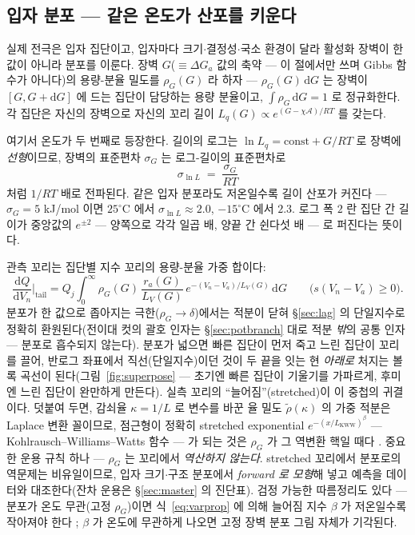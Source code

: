 \documentclass[11pt,a4paper]{article}
\newcommand{\dd}{\mathrm{d}}
\begin{document}
\subsection{입자 분포 — 같은 온도가 산포를 키운다}
실제 전극은 입자 집단이고, 입자마다 크기$\cdot$결정성$\cdot$국소 환경이 달라 활성화 장벽이 한 값이 아니라
분포를 이룬다. 장벽 $G$($\equiv\Delta G_{a}$ 값의 축약 — 이 절에서만 쓰며 Gibbs 함수가 아니다)의
용량-분율 밀도를 $\rho_G(G)$ 라 하자 — $\rho_G(G)\,\dd G$ 는 장벽이
$[G,G+\dd G]$ 에 드는 집단이 담당하는 용량 분율이고, $\int\rho_G\,\dd G=1$ 로 정규화한다. 각 집단은
자신의 장벽으로 자신의 꼬리 길이 $L_q(G)\propto e^{(G-\chi\mathcal A)/RT}$ 를 갖는다.

여기서 온도가 두 번째로 등장한다. 길이의 로그는 $\ln L_q=\text{const}+G/RT$ 로 장벽에 \emph{선형}이므로,
장벽의 표준편차 $\sigma_G$ 는 로그-길이의 표준편차로
\begin{equation}
\sigma_{\ln L}\;=\;\frac{\sigma_G}{RT}
\label{eq:varprop}
\end{equation}
처럼 $1/RT$ 배로 전파된다. 같은 입자 분포라도 저온일수록 길이 산포가 커진다 — $\sigma_G=5$ kJ/mol 이면
$25^\circ$C 에서 $\sigma_{\ln L}\approx2.0$, $-15^\circ$C 에서 $2.3$. 로그 폭 $2$ 란 집단 간 길이가 중앙값의
$e^{\pm2}$ — 양쪽으로 각각 일곱 배, 양끝 간 쉰다섯 배 — 로 퍼진다는 뜻이다.

관측 꼬리는 집단별 지수 꼬리의 용량-분율 가중 합이다:
\begin{equation}
\frac{\dd Q}{\dd V_n}\Big|_{\text{tail}}
=Q_j\!\int_0^\infty\!\rho_G(G)\,\frac{r_a(G)}{L_V(G)}\,
e^{-(V_n-V_a)/L_V(G)}\,\dd G\qquad\big(s(V_n-V_a)\ge0\big).
\label{eq:superpose}
\end{equation}
분포가 한 값으로 좁아지는 극한($\rho_G\to\delta$)에서는 적분이 닫혀 \S\ref{sec:lag} 의 단일지수로
정확히 환원된다(전이대 컷의 괄호 인자는 \S\ref{sec:potbranch} 대로 적분 \emph{밖}의 공통 인자 —
분포로 흡수되지 않는다). 분포가 넓으면 빠른 집단이 먼저 죽고 느린 집단이 꼬리를 끌어, 반로그 좌표에서 직선(단일지수)이던
것이 두 끝을 잇는 현 \emph{아래로} 처지는 볼록 곡선이 된다(그림~\ref{fig:superpose} — 초기엔 빠른
집단이 기울기를 가파르게, 후미엔 느린 집단이 완만하게 만든다). 실측 꼬리의 ``늘어짐''(stretched)이 이
중첩의 귀결이다. 덧붙여 두면, 감쇠율 $\kappa=1/L$ 로 변수를 바꾼 율 밀도 $\tilde\rho(\kappa)$ 의 가중 적분은
Laplace 변환 꼴이므로, 점근형이 정확히
stretched exponential $e^{-(x/L_{\mathrm{KWW}})^\beta}$ — Kohlrausch--Williams--Watts 함수 — 가 되는
것은 $\rho_G$ 가 그 역변환 핵일 때다 \cite{lindsey1980,johnston2006,svare2000}. 중요한 운용 규칙 하나 —
$\rho_G$ 는 꼬리에서 \emph{역산하지 않는다}. stretched 꼬리에서 분포로의 역문제는 비유일이므로, 입자
크기$\cdot$구조 분포에서 \emph{forward 로 모형}해 넣고 예측을 데이터와 대조한다(잔차 운용은
\S\ref{sec:master} 의 진단표). 검정 가능한 따름정리도 있다 — 분포가 온도 무관(고정 $\rho_G$)이면
식~\eqref{eq:varprop} 에 의해 늘어짐 지수 $\beta$ 가 저온일수록 작아져야 한다 \cite{svare2000};
$\beta$ 가 온도에 무관하게 나오면 고정 장벽 분포 그림 자체가 기각된다.
\end{document}

